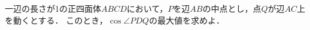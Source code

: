 \documentclass[../../main.tex]{subfiles}
\begin{document}
一辺の長さが1の正四面体$ABCD$において，$P$を辺$AB$の中点とし，点$Q$が辺$AC$上を動くとする．
このとき，$\cos\angle PDQ$の最大値を求めよ．
\end{document}
